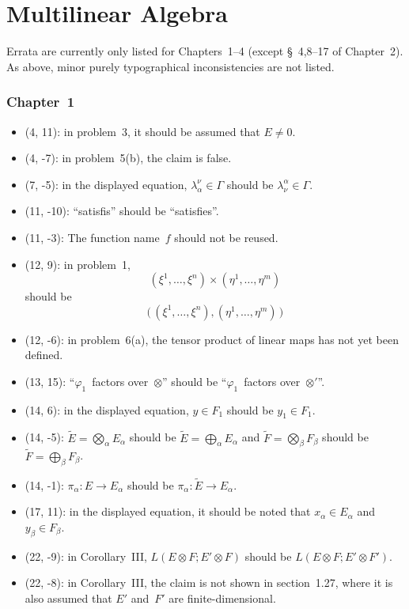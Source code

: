 \documentclass[letterpaper,12pt]{article}
\newcommand{\bigdsum}{\bigoplus}
\newcommand{\tprod}{\otimes}
\newcommand{\bigtprod}{\bigotimes}
\begin{document}
\newpage
\part*{Multilinear Algebra}
Errata are currently only listed for Chapters~1--4 (except \S~4,8--17 of Chapter~2). As above, minor purely typographical inconsistencies are not listed.

\section*{Chapter~1}
\begin{itemize}
\item (4, 11): in problem~3, it should be assumed that \(E\ne 0\).
\item (4, -7): in problem~5(b), the claim is false.
\item (7, -5): in the displayed equation, \(\lambda^{\nu}_{\alpha}\in\Gamma\) should be \(\lambda^{\alpha}_{\nu}\in\Gamma\).
\item (11, -10): ``satisfis'' should be ``satisfies''.
\item (11, -3): The function name~\(f\) should not be reused.
\item (12, 9): in problem~1,
\[(\xi^1,\ldots,\xi^n)\times(\eta^1,\ldots,\eta^m)\]
should be
\[\bigl(\,(\xi^1,\ldots,\xi^n),(\eta^1,\ldots,\eta^m)\,\bigr)\]
\item (12, -6): in problem~6(a), the tensor product of linear maps has not yet been defined.
\item (13, 15): ``\(\varphi_1\)~factors over~\(\tprod\)'' should be ``\(\varphi_1\)~factors over~\(\tprod'\)''.
\item (14, 6): in the displayed equation, \(y\in F_1\) should be \(y_1\in F_1\).
\item (14, -5): \(\widetilde{E}=\bigtprod_{\alpha}E_{\alpha}\) should be \(\widetilde{E}=\bigdsum_{\alpha}E_{\alpha}\) and \(\widetilde{F}=\bigtprod_{\beta}F_{\beta}\) should be \(\widetilde{F}=\bigdsum_{\beta}F_{\beta}\).
\item (14, -1): \(\pi_{\alpha}:E\to E_{\alpha}\) should be \(\pi_{\alpha}:\widetilde{E}\to E_{\alpha}\).
\item (17, 11): in the displayed equation, it should be noted that \(x_{\alpha}\in E_{\alpha}\) and \(y_{\beta}\in F_{\beta}\).
\item (22, -9): in Corollary~III, \(L(E\tprod F;E'\tprod F)\) should be \(L(E\tprod F;E'\tprod F')\).
\item (22, -8): in Corollary~III, the claim is not shown in section~1.27, where it is also assumed that \(E'\) and~\(F'\) are finite-dimensional.

\end{itemize}
\end{document}
